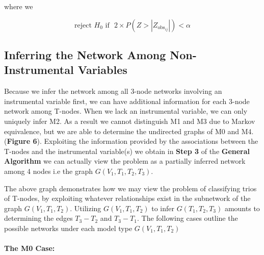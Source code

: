 \documentclass[12pt]{report}
\begin{document}
where we 

\[ \text{reject $H_0$ if} \ \ \ 2\times P(Z >  |Z_{\text{obs}_{ij}}|) < \alpha \]

\subsection*{Inferring the Network Among Non-Instrumental Variables}

Because we infer the network among all 3-node networks involving an instrumental variable first, we can have additional information for each 3-node network among T-nodes. When we lack an instrumental variable, we can only uniquely infer M2. As a result we cannot distinguish M1 and M3 due to Markov equivalence, but we are able to determine the undirected graphs of M0 and M4. (\textbf{Figure 6}). Exploiting the information provided by the associations between the T-nodes and the instrumental variable(s) we obtain in \textbf{Step 3} of the \textbf{General Algorithm} we can actually view the problem as a partially inferred network among 4 nodes i.e the graph $G(V_1, T_1, T_2, T_3)$.\\


\begin{center}
\end{center}
The above graph demonstrates how we may view the problem of classifying trios of T-nodes, by exploiting whatever relationships exist in the subnetwork of the  graph $G(V_1, T_1,T_2)$. Utilizing $G(V_1, T_1,T_2)$ to infer $G(T_1,T_2,T_3)$ amounts to determining the edges $ T_3 - T_2$ and $T_3 - T_1$. The following cases outline the possible networks under each model type $G(V_1, T_1,T_2)$\\
\\


\textbf{The M0 Case:}
\\

\begin{center}
\end{center}
\end{document}
